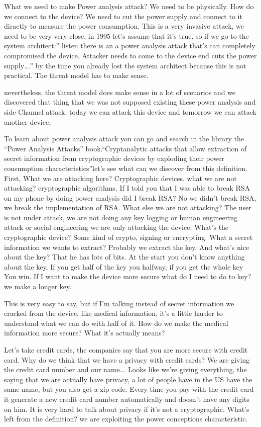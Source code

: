 What we need to make Power analysis attack? We need to be physically. How do we
connect to the device? We need to cut the power supply and connect to it
diractly to measure the power consumption. This is a very invasive attack, we
need to be very very close. in 1995 let's assume that it's true. so if we go to
the system architect:” listen there is an a power analysis attack that's can
completely compromised the device. Attacker needs to come to the device end cuts
the power supply….” by the time you already lost the system architect because
this is not practical. The threat model has to make sense.
 
nevertheless, the threat model does make sense in a lot of scenarios and we
discovered that thing that we was not supposed existing these power analysis and
side Channel attack. today we can attack this device and tomorrow we can attack
another device.

To learn about power analysis attack you can go and search in the library the
“Power Analysis Attacks” book.“Cryptanalytic attacks that allow extraction of
secret information from cryptographic devices by exploding their power
consumption characteristics”let's see what can we discover from this definition.
First, What we are attacking here? Cryptographic devices. what we are not
attacking? cryptographic algorithms. If I told you that I was able to break RSA
on my phone by doing power analysis did I break RSA? No we didn't break RSA, we
break the implementation of RSA. What else we are not attacking? The user is not
under attack, we are not doing any key logging or human engineering attack or
social engineering we are only attacking the device. What's the cryptographic
device? Some kind of crypto, signing or encrypting. What a secret information we
wants to extract? Probably we extract the key. And what's nice about the key?
That he has lots of bits. At the start you don't know anything about the key, If
you get half of the key you halfway, if you get the whole key You win. If I want
to make the device more secure what do I need to do to key? we make a longer
key.

This is very easy to say, but if I'm talking instead of secret information we
cracked from the device, like medical information, it's a little harder to
understand what we can do with half of it. How do we make the medical
information more secure? What it's actually means?

Let's take credit cards, the companies say that you are more secure with credit
card. Why do we think that we have a privacy with credit cards? We are giving
the credit card number and our name... Looks like we're giving everything, the
saying that we are actually have privacy, a lot of people have in the US have
the same name, but you also get a zip code. Every time you pay with the credit
card it generate a new credit card number automatically and doesn't have any
digits on him. It is very hard to talk about privacy if it's not a
cryptographic. What's left from the definition? we are exploiting the power
conceptions characteristic.

